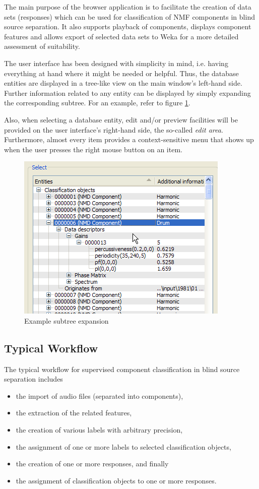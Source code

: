 The main purpose of the browser application is to facilitate the creation
of data sets (responses) which can be used for classification of NMF components
in blind source separation. It also supports playback of components,
displays component features and allows export of selected
data sets to Weka \cite{Weka} for a more detailed assessment of suitability.

The user interface has been designed with simplicity in mind, i.e. having
everything at hand where it might be needed or helpful. Thus, the database
entities are displayed in a tree-like view on the main window's left-hand side.
Further information related to any entity can be displayed by simply expanding
the corresponding subtree. For an example, refer to figure
\ref{figure:ExpandedSubtree}.

Also, when selecting a database entity, edit and/or preview facilities will be
provided on the user interface's right-hand side, the so-called \emph{edit
  area}. Furthermore, almost every item provides a context-sensitive menu that
shows up when the user presses the right mouse button on an item.

\begin{figure}
    \centering
    \includegraphics[width=.7\textwidth]{images/ExpandedSubtree.png}
    \caption{%
        \label{figure:ExpandedSubtree}%
        Example subtree expansion
    }
\end{figure}


\subsection{Typical Workflow}

The typical workflow for supervised component classification in blind source separation includes 
\begin{itemize}
  \item   the import of audio files (separated into components),
  \item   the extraction of the related features,
  \item   the creation of various labels with arbitrary precision,
  \item   the assignment of one or more labels to selected classification
    objects,
  \item   the creation of one or more responses, and finally
  \item   the assignment of classification objects to one or more responses.
\end{itemize}


